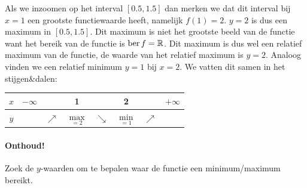 \documentclass[12pt,twoside]{article}
\begin{document}
\begin{theorie}
Als we inzoomen op het interval $[0.5,1.5]$ dan merken we dat dit interval bij $x=1$ een grootste functiewaarde heeft, namelijk $f(1)=2$. $y=2$ is dus een maximum in $[0.5,1.5]$. Dit maximum is niet het grootste beeld van de functie want het bereik van de functie is $\ber f=\mathbb{R}$. Dit maximum is dus wel een relatief maximum van de functie, de waarde van het relatief maximum is $y=2$. Analoog vinden we een relatief minimum $y=1$ bij $x=2$. We vatten dit samen in het stijgen\&dalen:

\begin{center}
  \begin{tabular}{c|lcccccr}
    $x$ & $-\infty$ & & 1 & & 2 & & $+\infty$\\
    \hline
    $y$ & & $\nearrow$ & $\underset{=2}{\max}$ & $\searrow$ & $\underset{=1}{\min}$ & $\nearrow$
  \end{tabular}
\end{center}

\paragraph{Onthoud!} Zoek de $y$-waarden om te bepalen waar de functie een minimum/maximum bereikt.

\newpage

\end{theorie}
\end{document}
